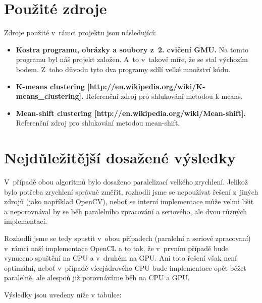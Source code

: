 \documentclass[11pt,a4paper]{article}
\begin{document}
\section{Použité zdroje}
Zdroje použité v~rámci projektu jsou následující:
\begin{itemize}
  \item \textbf{Kostra programu, obrázky a soubory z~2. cvičení GMU.} Na tomto programu byl náš projekt založen. A~to v~takové míře, že se stal výchozím bodem. Z~toho důvodu tyto dva programy sdílí velké množství kódu.
  \item \textbf{K-means clustering [http://en.wikipedia.org/wiki/K-means\_clustering].} Referenční zdroj pro shlukování metodou k-means.
  \item \textbf{Mean-shift clustering [http://en.wikipedia.org/wiki/Mean-shift].} Referenční zdroj pro shlukování metodou mean-shift.
\end{itemize}


\section{Nejdůležitější dosažené výsledky}
V~případě obou algoritmů bylo dosaženo paralelizací velkého zrychlení. Jelikož bylo potřeba zrychlení správně změřit, rozhodli jsme se nepoužívat řešení z~jiných zdrojů (jako například OpenCV), neboť se interní implementace může velmi lišit a neporovnával by se běh paralelního zpracování a seriového, ale dvou různých implementací.

Rozhodli jsme se tedy spustit v~obou případech (paralelní a seriové zpracovaní) v~rámci naší implementace OpenCL a to tak, že v~prvním případě bude vynuceno spuštění na CPU a v~druhém na GPU. Ani toto řešení však není optimální, neboť v~případě vícejádrového CPU bude implementace opět běžet paralelně, ale alespoň již porovnáváme běh na CPU a GPU.

Výsledky jsou uvedeny níže v tabulce:
\end{document}
